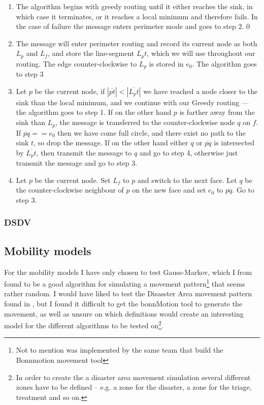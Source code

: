 \begin{enumerate}
\item The algorithm begins with greedy routing until it either reaches the sink, in which case it terminates, or it reaches a local minimum and therefore fails. In the case of failure the message enters perimeter mode and goes to step 2.
0\item The message will enter perimeter routing and record its current node as both $L_p$ and $L_f$, and store the line-segment $\overline{L_pt}$, which we will use throughout our routing. The edge counter-clockwise to $L_p$ is stored in $e_0$. The algorithm goes to step 3
\item Let $p$ be the current node, if $|\overline{pt}| < |\overline{L_pt}|$ we have reached a node closer to the sink than the local minimum, and we continue with our Greedy routing --- the algorithm goes to step 1. If on the other hand $p$ is farther away from the sink than $L_p$, the message is transferred to the counter-clockwise node $q$ on $f$. If $\overline{pq} == e_0$ then we have come full circle, and there exist no path to the sink $t$, so drop the message. If on the other hand either $q$ or $\overline{pq}$ is intersected by $\overline{L_pt}$, then transmit the message to $q$ and go to step 4, otherwise just transmit the message and go to step 3.
\item Let $p$ be the current node. Set $L_f$ to $p$ and switch to the next face. Let $q$ be the counter-clockwise neighbour of $p$ on the new face and set $e_0$ to $\overline{pq}$. Go to step 3. 
\end{enumerate}

\subsubsection{DSDV}


\subsection{Mobility models}

For the mobility models I have only chosen to test Gauss-Markov, which I from \cite{MobilityAdHocResearch} found to be a good algorithm for simulating a movement pattern\footnote{Not to mention was implemented by the same team that build the Bonnmotion movement tool} that seems rather random. I would have liked to test the Disasster Area movement pattern found in \cite{disasterArea}, but I found it difficult to get the bonnMotion tool to generate the movement, as well as unsure on which definitions would create an interesting model for the different algorithms to be tested on\footnote{In order to create the a disaster area movement simulation several different zones have to be defined -- e.g. a zone for the disaster, a zone for the triage, treatment and so on.}. 

